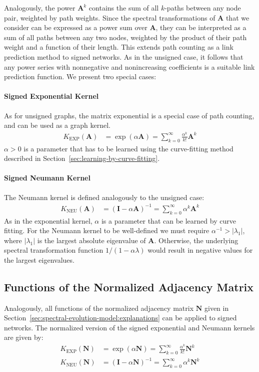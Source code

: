 \documentclass[11pt,a4paper]{book}
\begin{document}
Analogously, the power $\mathbf A^k$ contains the sum of all $k$-paths
between any node pair, weighted by path weights.  Since the
spectral transformations of $\mathbf A$ that we consider 
can be expressed as a power sum over $\mathbf A$, they can be
interpreted as a sum of all paths between any two nodes, weighted by the
product of their path weight and a function of their length.  
This extends path counting as a link prediction method to signed
networks. 
As in the unsigned case, it follows that any power series
with nonnegative and nonincreasing coefficients is a suitable link
prediction function.  We present two special cases:

\paragraph{Signed Exponential Kernel} 
As for unsigned graphs, the matrix exponential is a special case of path
counting, and can be used as a graph kernel. 
\begin{align}
  K_{\mathrm{EXP}}(\mathbf A) &= \exp(\alpha \mathbf A) 
  = \sum_{k=0}^\infty \frac {\alpha^k} {k!} \mathbf A^k 
\end{align}
$\alpha > 0$ is a
parameter that has to be learned using the curve-fitting method described
in Section~\ref{sec:learning-by-curve-fitting}.  

\paragraph{Signed Neumann Kernel}
The Neumann kernel is defined analogously to the
unsigned case:
\begin{align}
  K_{\mathrm{NEU}}(\mathbf A) &= ( \mathbf I - \alpha \mathbf A)^{-1} 
  = \sum_{k=0}^\infty \alpha^k \mathbf A^k
\end{align}
As in the exponential kernel, $\alpha$ is a parameter that can be
learned by curve fitting.  For the Neumann kernel to be well-defined 
we must require $\alpha^{-1} > |\lambda_1|$, where $|\lambda_1|$ is the
largest absolute eigenvalue of $\mathbf A$. 
Otherwise, the underlying spectral transformation function $1/(1 -
\alpha \lambda)$ would result in negative values for the largest
eigenvalues. 

\subsection{Functions of the Normalized Adjacency Matrix}
Analogously, all functions of the normalized adjacency matrix $\mathbf
N$ given in Section~\ref{sec:spectral-evolution-model:explanations} can
be applied to signed networks. 
The normalized version of the signed exponential and Neumann kernels
are given by:
\begin{align}
  K_{\mathrm{EXP}}(\mathbf N) &= \exp(\alpha \mathbf N) 
  = \sum_{k=0}^\infty \frac {\alpha^k}{k!} \mathbf
  N^k \label{eq:signed-normalized-matrix-exponential} \\ 
  K_{\mathrm{NEU}}(\mathbf N) &= (\mathbf I - \alpha \mathbf N)^{-1} 
  = \sum_{k=0}^\infty \alpha^k \mathbf N^k 
  \label{eq:signed-normalized-neumann-kernel}
\end{align}
\end{document}
